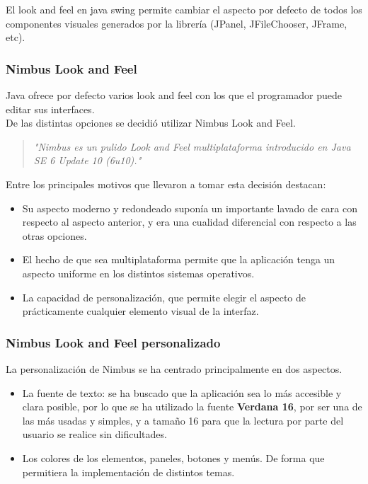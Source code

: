 El look and feel en java swing permite cambiar el aspecto por defecto de todos los componentes visuales generados por la librería (JPanel, JFileChooser, JFrame, etc).

\subsubsection{Nimbus Look and Feel}
Java ofrece por defecto varios look and feel con los que el programador puede editar sus interfaces.\\

De las distintas opciones se decidió utilizar Nimbus Look and Feel.
\begin{quote}
    \textit{"Nimbus es un pulido Look and Feel multiplataforma introducido en Java SE 6 Update 10 (6u10)."}\cite{nimbus}
\end{quote}

Entre los principales motivos que llevaron a tomar esta decisión destacan:
\begin{itemize}
    \item Su aspecto moderno y redondeado suponía un importante lavado de cara con respecto al aspecto anterior, y era una cualidad diferencial con respecto a las otras opciones.
    \item El hecho de que sea multiplataforma permite que la aplicación tenga un aspecto uniforme en los distintos sistemas operativos.
    \item La capacidad de personalización, que permite elegir el aspecto de prácticamente cualquier elemento visual de la interfaz.
\end{itemize}
\subsubsection{Nimbus Look and Feel personalizado}
La personalización de Nimbus se ha centrado principalmente en dos aspectos.
\begin{itemize}
    \item La fuente de texto: se ha buscado que la aplicación sea lo más accesible y clara posible, por lo que se ha utilizado la fuente \textbf{Verdana 16}, por ser una de las más usadas y simples, y a tamaño 16 para que la lectura por parte del usuario se realice sin dificultades.
    \item Los colores de los elementos, paneles, botones y menús. De forma que permitiera la implementación de distintos temas.
\end{itemize}

